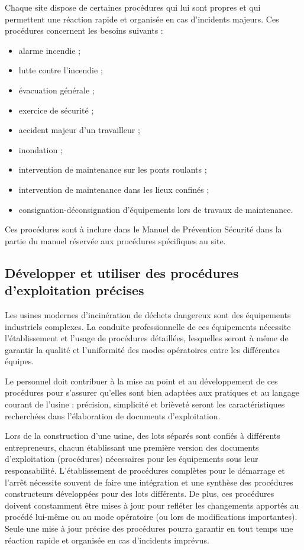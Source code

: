 Chaque site dispose de certaines procédures qui lui sont propres et qui permettent une réaction rapide et organisée en cas d’incidents majeurs. Ces procédures concernent les besoins suivants :

\begin{itemize}

\item alarme incendie ;
\item lutte contre l’incendie ;
\item évacuation générale ;
\item exercice de sécurité ;
\item accident majeur d’un travailleur ;
\item inondation ;
\item intervention de maintenance sur les ponts roulants ;
\item intervention de maintenance dans les lieux confinés ;
\item consignation-déconsignation d’équipements lors de travaux de maintenance.
\end{itemize}

Ces procédures sont à inclure dans le Manuel de Prévention Sécurité dans la partie du manuel réservée aux procédures spécifiques au site.


\subsection{Développer et utiliser des procédures d’exploitation précises } 

Les usines modernes d’incinération de déchets dangereux sont des équipements industriels complexes. La conduite professionnelle de ces équipements nécessite l’établissement et l’usage de procédures détaillées, lesquelles seront à même de garantir la qualité et l’uniformité des modes opératoires entre les différentes équipes.
\vspace{0.3cm} 

Le personnel doit contribuer à la mise au point et au développement de ces procédures pour s’assurer qu’elles sont bien adaptées aux pratiques et au langage courant de l’usine : précision, simplicité et brièveté seront les caractéristiques recherchées dans l’élaboration de documents d’exploitation.

 \vspace{0.3cm} 

Lors de la construction d’une usine, des lots séparés sont confiés à différents entrepreneurs, chacun établissant une première version des documents d’exploitation (procédures) nécessaires pour les équipements sous leur responsabilité. L’établissement de procédures complètes pour le démarrage et l’arrêt nécessite souvent de faire une intégration et une synthèse des procédures constructeurs développées pour des lots différents. De plus, ces procédures doivent constamment être mises à jour pour refléter les changements apportés au procédé lui-même ou au mode opératoire (ou lors de modifications importantes). Seule une mise à jour précise des procédures pourra garantir en tout temps une réaction rapide et organisée en cas d’incidents imprévus.



